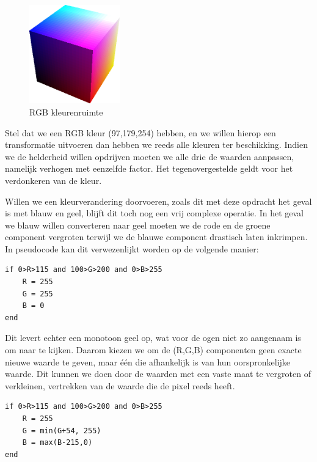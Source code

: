 		\begin{figure}[H]
			\centering
			\includegraphics[width=0.35\textwidth]{Chapters/Chapter1/Images/RGBspace.png}
			\caption{RGB kleurenruimte~\cite{bib_17}}
			\label{fig:RGBColorSpaceImage}
		\end{figure}
		
		\par Stel dat we een RGB kleur (97,179,254) hebben, en we willen hierop een transformatie uitvoeren dan hebben we reeds alle kleuren ter beschikking. Indien we de helderheid willen opdrijven moeten we alle drie de waarden aanpassen, namelijk verhogen met eenzelfde factor. Het tegenovergestelde geldt voor het verdonkeren van de kleur.
		\par Willen we een kleurverandering doorvoeren, zoals dit met deze opdracht het geval is met blauw en geel, blijft dit toch nog een vrij complexe operatie. In het geval we blauw willen converteren naar geel moeten we de rode en de groene component vergroten terwijl we de blauwe component drastisch laten inkrimpen. In pseudocode kan dit verwezenlijkt worden op de volgende manier:
		\bigskip
   		\begin{lstlisting}[language=VBScript, caption=Pseudocode voor het vervangen van blauw met geel]
if 0>R>115 and 100>G>200 and 0>B>255
   	R = 255
   	G = 255
   	B = 0
end		\end{lstlisting}

		Dit levert echter een monotoon geel op, wat voor de ogen niet zo aangenaam is om naar te kijken. Daarom kiezen we om de (R,G,B) componenten geen exacte nieuwe waarde te geven, maar \'e\'en die afhankelijk is van hun oorspronkelijke waarde. Dit kunnen we doen door de waarden met een vaste maat te vergroten of verkleinen, vertrekken van de waarde die de pixel reeds heeft.
		\bigskip
		\begin{lstlisting}[language=VBScript, caption=Pseudocode voor het vervangen van blauw met geel met behoud van tinten]
if 0>R>115 and 100>G>200 and 0>B>255
	R = 255
	G = min(G+54, 255)
	B = max(B-215,0)
end		\end{lstlisting}

